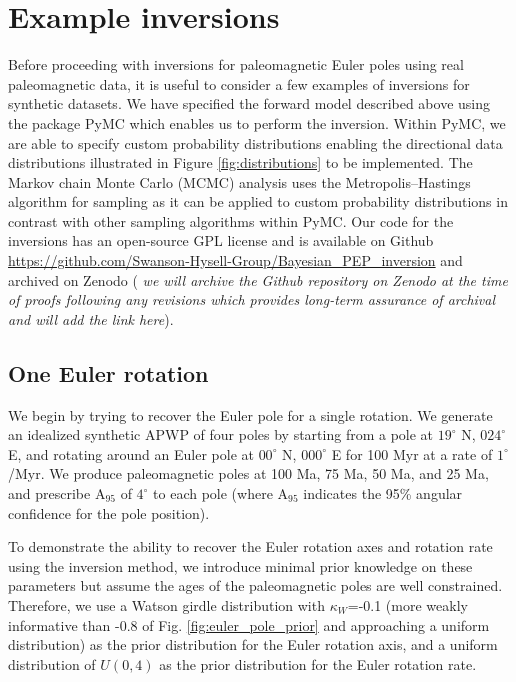 \documentclass[11pt,letterpaper]{article}
\begin{document}
\section*{Example inversions}
\label{sec:example_inversion}

Before proceeding with inversions for paleomagnetic Euler poles using real paleomagnetic data, it is useful to consider a few examples of inversions for synthetic datasets. We have specified the forward model described above using the package PyMC \citep{Salvatier2016a} which enables us to perform the inversion. Within PyMC, we are able to specify custom probability distributions enabling the directional data distributions illustrated in Figure \ref{fig:distributions} to be implemented. The Markov chain Monte Carlo (MCMC) analysis uses the Metropolis–Hastings algorithm for sampling as it can be applied to custom probability distributions in contrast with other sampling algorithms within PyMC. Our code for the inversions has an open-source GPL license and is available on Github \url{https://github.com/Swanson-Hysell-Group/Bayesian_PEP_inversion} and archived on Zenodo ( \textit{we will archive the Github repository on Zenodo at the time of proofs following any revisions which provides long-term assurance of archival and will add the link here}).


\subsection*{One Euler rotation}
\label{sec:one_stage_pole}
We begin by trying to recover the Euler pole for a single rotation. We generate an idealized synthetic APWP of four poles by starting from a pole at $19^\circ$ N, $024^\circ$ E, and rotating around an Euler pole at $00^\circ$ N, $000^\circ$ E for 100 Myr at a rate of $1^\circ$/Myr. We produce paleomagnetic poles at 100 Ma, 75 Ma, 50 Ma, and 25 Ma, and prescribe A$_{95}$ of $4^\circ$ to each pole (where A$_{95}$ indicates the 95\% angular confidence for the pole position).

To demonstrate the ability to recover the Euler rotation axes and rotation rate using the inversion method, we introduce minimal prior knowledge on these parameters but assume the ages of the paleomagnetic poles are well constrained. Therefore, we use a Watson girdle distribution with $\kappa_W$=-0.1 (more weakly informative than -0.8 of Fig. \ref{fig:euler_pole_prior} and approaching a uniform distribution) as the prior distribution for the Euler rotation axis, and a uniform distribution of $U(0, 4)$ as the prior distribution for the Euler rotation rate. 
\end{document}
